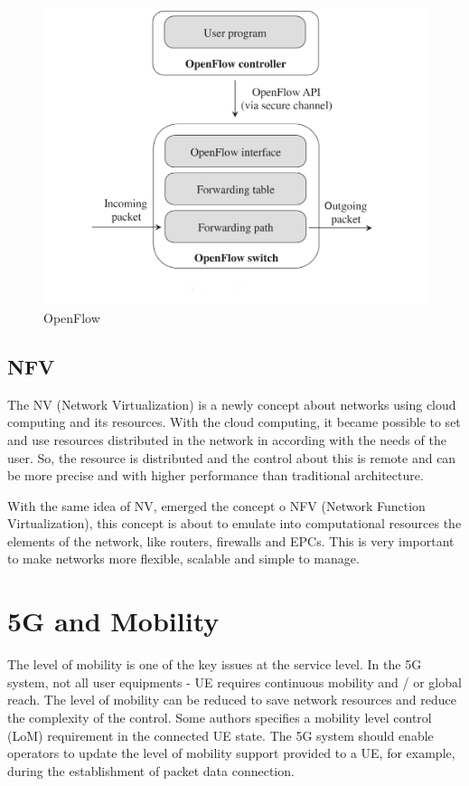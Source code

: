 \documentclass[12pt]{article}
\begin{document}
\begin{figure}[ht]
\centering
\includegraphics[width=.7\textwidth]{figure3.png}
\caption{OpenFlow}
\label{figure 3: OpenFlow}
\end{figure}


\subsection{NFV}

The NV (Network Virtualization) is a newly concept about networks using cloud computing and its resources. With the cloud computing, it became possible to set and use resources distributed in the network in according with the needs of the user. So, the resource is distributed and the control about this is remote and can be more precise and with higher performance than traditional architecture.

With the same idea of NV, emerged the concept o NFV (Network Function Virtualization), this concept is about to emulate into computational resources the elements of the network, like routers, firewalls and EPCs. This is very important to make networks more flexible, scalable and simple to manage.


\section{5G and Mobility}

The level of mobility is one of the key issues at the service level. In the 5G system, not all user equipments - UE requires continuous mobility and / or global reach. The level of mobility can be reduced to save network resources and reduce the complexity of the control. Some authors specifies a mobility level control (LoM) requirement in the connected UE state. The 5G system should enable operators to update the level of mobility support provided to a UE, for example, during the establishment of packet data connection.
\end{document}
